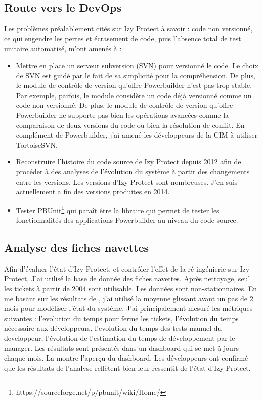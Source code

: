 \documentclass[a4paper]{article}
\begin{document}
\subsection{Route vers le DevOps}
\label{sec: devOps}
Les problèmes préalablement cités sur Izy Protect à savoir : code non versionné, ce qui engendre les pertes et écrasement de code, puis l'absence total de test unitaire automatisé, m'ont amenés à :
\begin{itemize}
\item Mettre en place un serveur subversion (SVN) pour versionné le code. 
Le choix de SVN est guidé par le fait de sa simplicité pour la compréhension. 
De plus, le module de contrôle de version qu'offre Powerbuilder n'est pas trop stable. 
Par exemple, parfois, le module considère un code déjà versionné comme un code non versionné.
De plus, le module de contrôle de version qu'offre Powerbuilder ne supporte pas bien les opérations avancées comme la comparaison de deux versions du code ou bien la résolution de conflit. En complément de Powerbuilder, j'ai amené les développeurs de la CIM à utiliser TortoiseSVN.
\item Reconstruire l'histoire du code source de Izy Protect depuis 2012 afin de procéder à des analyses de l'évolution du système à partir des changements entre les versions. Les versions d'Izy Protect sont nombreuses. J'en suis actuellement a fin des versions produites en 2014.
\item Tester PBUnit\footnote{https://sourceforge.net/p/pbunit/wiki/Home/} qui paraît être la libraire qui permet de tester les fonctionnalités des applications Powerbuilder au niveau du code source. 

\end{itemize}

\subsection{Analyse des fiches navettes}
\label{sec:analyseDesFichesNavettes}
Afin d'évaluer l'état d'Izy Protect, et contrôler l'effet de la ré-ingénierie sur Izy Protect,
J'ai utilisé la base de donnée des fiches navettes. 
Après nettoyage, seul les tickets à partir de 2004 sont utilisable. 
Les données sont non-stationnaires. 
En me basant sur les résultats de \cite{Raja09}, j'ai utilisé la moyenne glissant avant un pas de 2 mois pour modéliser l'état du système.
J'ai principalement mesuré les métriques suivantes : l'evolution du temps pour ferme les tickets, l'évolution du temps nécessaire aux développeurs, l'evolution du temps des tests manuel du developpeur, l'évolution de l'estimation du temps de développement par le manager.
Les résultats sont présentés dans un dashboard qui se met à jours chaque mois.
La  montre l'aperçu du dashboard.
Les développeurs ont confirmé que les résultats de l'analyse reflètent bien leur ressentit de l'état d'Izy Protect. 
\end{document}
